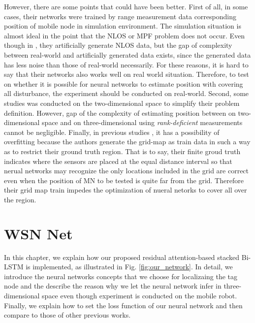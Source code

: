\documentclass[letterpaper, 10 pt, conference]{ieeeconf}  %
\begin{document}
However, there are some points that could have been better. First of all, in some cases, their networks were trained by range measurement data corresponding position of mobile node in simulation environment\cite{chatterjee2010fletcher, shareef2008localization, rahman2009localization, singh2013tdoa, banihashemian2018new}. The simulation situation is almost ideal in the point that the NLOS or MPF problem does not occur. Even though in \cite{rahman2009localization}, they artificially generate NLOS data, but the gap of complexity between real-world and artificially generated data exists, since the generated data has less noise than those of real-world necessarily. For these reasons, it is hard to say that their networks also works well on real world situation. Therefore, to test on whether it is possible for neural networks to estimate position with covering all disturbance, the experiment should be conducted on real-world. 
Second, some studies was conducted on the two-dimensional space to simplify their problem definition\cite{shareef2008localization, rahman2009localization, singh2013tdoa,bernas2015fully, kumar2016localization, banihashemian2018new}. However, gap of the complexity of estimating position between on two-dimensional space and on three-dimensional using \textit{rank-deficient} measurements cannot be negligible. Finally, in previous studies \cite{shareef2008localization, rahman2009localization, singh2013tdoa,kumar2016localization}, it has a possibility of overfitting because the authors generate the grid-map as train data in such a way as to restrict their ground truth region. That is to say, their finite groud truth indicates where the sensors are placed at the equal distance interval so that nerual networks may recognize the only locations included in the grid are correct even when the position of MN to be tested is quite far from the grid. Therefore their grid map train impedes the optimization of nueral netorks to cover all over the region.

\section{WSN Net}

In this chapter, we explain how our proposed residual attention-based stacked Bi-LSTM is implemented, as illustrated in Fig. \ref{fig:our_network}. 
In detail, we introduce the neural networks concepts that we choose for localizaing the tag node and the describe the reason why we let the neural network infer in three-dimensional space even though experiment is conducted on the mobile robot. Finally, we explain how to set the loss function of our neural network and then compare to those of other previous works.
\end{document}
